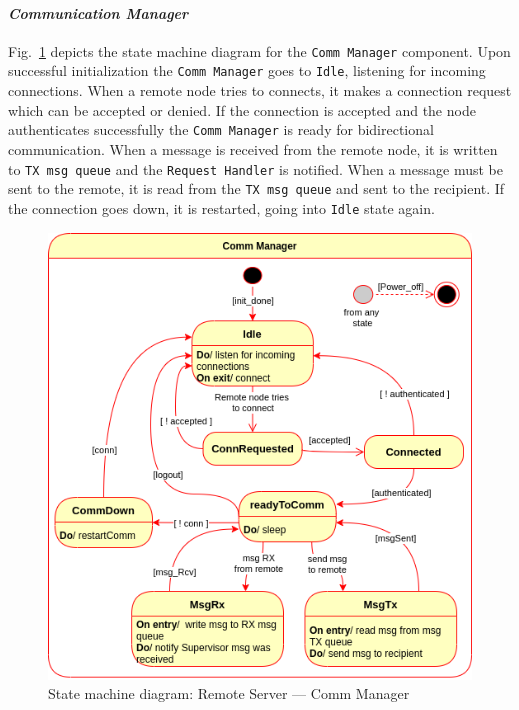 \paragraph{\emph{Communication Manager}}
Fig.~\ref{fig:state-mach-rs-comm} depicts the state machine diagram for the
\texttt{Comm Manager} component. Upon successful initialization the
\texttt{Comm Manager} goes to \texttt{Idle}, listening for incoming
connections. When a remote node tries to connects, it makes a connection request
which can be accepted or denied. If the connection is accepted and the node
authenticates successfully the \texttt{Comm Manager} is ready for bidirectional
communication. When a message is received from the remote node, it is written to
\texttt{TX msg queue} and the \texttt{Request Handler} is notified. When a message
must be sent to the remote, it is read from the \texttt{TX msg queue} and sent
to the recipient. If the connection goes down, it is restarted, going into
\texttt{Idle} state again.
%
\begin{figure}[htb!]
\centering
    \includegraphics[width=0.6\columnwidth]{./img/state-mach-rs-comm.png}
  \caption{State machine diagram: Remote Server --- Comm Manager}%
\label{fig:state-mach-rs-comm}
\end{figure}
%
%
